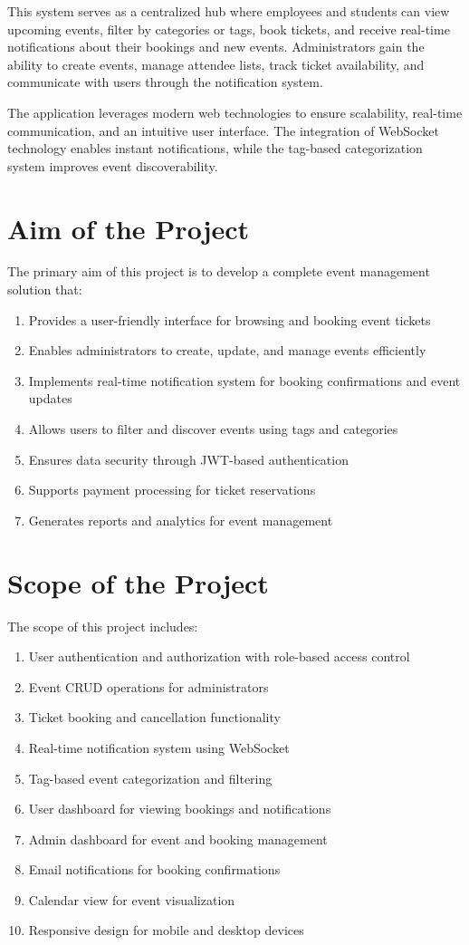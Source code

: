 \documentclass[12pt]{report}
\begin{document}
This system serves as a centralized hub where employees and students can view upcoming events, filter by categories or tags, book tickets, and receive real-time notifications about their bookings and new events. Administrators gain the ability to create events, manage attendee lists, track ticket availability, and communicate with users through the notification system.

The application leverages modern web technologies to ensure scalability, real-time communication, and an intuitive user interface. The integration of WebSocket technology enables instant notifications, while the tag-based categorization system improves event discoverability.

\linespread{1.5} 
\section{Aim of the Project} 
The primary aim of this project is to develop a complete event management solution that:
\begin{enumerate}
\item Provides a user-friendly interface for browsing and booking event tickets
\item Enables administrators to create, update, and manage events efficiently
\item Implements real-time notification system for booking confirmations and event updates
\item Allows users to filter and discover events using tags and categories
\item Ensures data security through JWT-based authentication
\item Supports payment processing for ticket reservations
\item Generates reports and analytics for event management
\end{enumerate}

\section{Scope of the Project} 
The scope of this project includes:
\begin{enumerate}
\item User authentication and authorization with role-based access control
\item Event CRUD operations for administrators
\item Ticket booking and cancellation functionality
\item Real-time notification system using WebSocket
\item Tag-based event categorization and filtering
\item User dashboard for viewing bookings and notifications
\item Admin dashboard for event and booking management
\item Email notifications for booking confirmations
\item Calendar view for event visualization
\item Responsive design for mobile and desktop devices
\end{enumerate}
\end{document}
